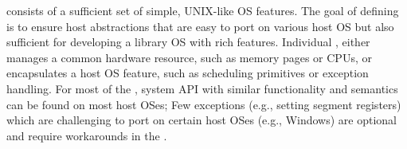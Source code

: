 \label{sec:abi:summary}



\Thehostabi{} consists of a sufficient set of simple, UNIX-like OS features.
The goal of defining \thehostabi{}
is to ensure host abstractions that are easy to port on various host OS but also sufficient for developing a library OS with rich features.
Individual \hostapi{},
either manages a common hardware resource, such as memory pages or CPUs,
or encapsulates a host OS feature, such as scheduling primitives or exception handling.
For most of the \hostapis{}, system API with similar functionality and semantics
can be found on most host OSes;
Few exceptions
(e.g., setting segment registers)
which are challenging to port on certain host OSes (e.g., Windows)
are optional and require workarounds in the \libos{}.


